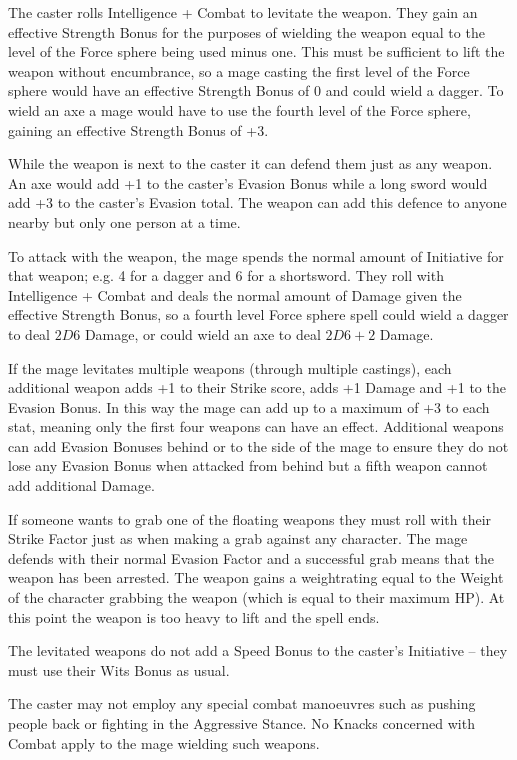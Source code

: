 \begin{multicols}{2}
The caster rolls Intelligence + Combat to levitate the weapon.
They gain an effective Strength Bonus for the purposes of wielding the weapon equal to the level of the Force sphere being used minus one.
This must be sufficient to lift the weapon without encumbrance, so a mage casting the first level of the Force sphere would have an effective Strength Bonus of 0 and could wield a dagger.
To wield an axe a mage would have to use the fourth level of the Force sphere, gaining an effective Strength Bonus of +3.

While the weapon is next to the caster it can defend them just as any weapon. An axe would add +1 to the caster's Evasion Bonus while a long sword would add +3 to the caster's Evasion total. The weapon can add this defence to anyone nearby but only one person at a time.

To attack with the weapon, the mage spends the normal amount of Initiative for that weapon; e.g. 4 for a dagger and 6 for a shortsword.
They roll with Intelligence + Combat and deals the normal amount of Damage given the effective Strength Bonus, so a fourth level Force sphere spell could wield a dagger to deal $2D6$ Damage, or could wield an axe to deal $2D6+2$ Damage.

If the mage levitates multiple weapons (through multiple castings), each additional weapon adds +1 to their Strike score, adds +1 Damage and +1 to the Evasion Bonus. In this way the mage can add up to a maximum of +3 to each stat, meaning only the first four weapons can have an effect. Additional weapons can add Evasion Bonuses behind or to the side of the mage to ensure they do not lose any Evasion Bonus when attacked from behind but a fifth weapon cannot add additional Damage.

If someone wants to grab one of the floating weapons they must roll with their Strike Factor just as when making a grab against any character.
The mage defends with their normal Evasion Factor and a successful grab means that the weapon has been arrested.
The weapon gains a \gls{weightrating} equal to the Weight of the character grabbing the weapon (which is equal to their maximum HP).
At this point the weapon is too heavy to lift and the spell ends.

The levitated weapons do not add a Speed Bonus to the caster's Initiative -- they must use their Wits Bonus as usual.

The caster may not employ any special combat manoeuvres such as pushing people back or fighting in the Aggressive Stance. No Knacks concerned with Combat apply to the mage wielding such weapons.


\end{multicols}

